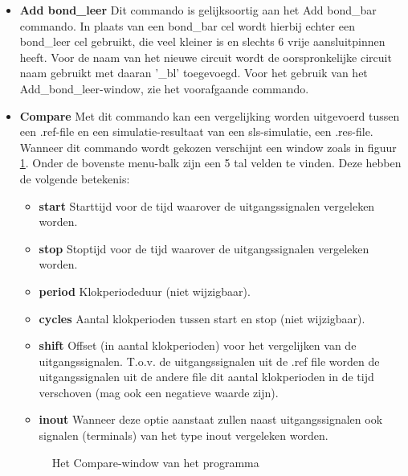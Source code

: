\begin{itemize}
\item{\bf Add bond\_leer}
Dit commando is gelijksoortig aan het Add bond\_bar commando.
In plaats van een bond\_bar cel wordt hierbij echter een bond\_leer cel gebruikt,
die veel kleiner is en slechts 6 vrije aansluitpinnen heeft.
Voor de naam van het nieuwe circuit wordt de oorspronke\-lij\-ke circuit naam
gebruikt met daaran '\_bl' toegevoegd.
Voor het gebruik van het Add\_bond\_leer-window, zie het voorafgaande commando.

\item{\bf Compare}
Met dit commando kan een vergelijking worden uitgevoerd tussen een .ref-file en
een simulatie-resultaat van een sls-simulatie, een .res-file.
Wanneer dit commando wordt gekozen verschijnt een window zoals in
figuur \ref{compare-window}.
Onder de bovenste menu-balk zijn een 5 tal velden te vinden.
Deze hebben de volgende betekenis:
\begin{itemize}
\item {\bf start} Starttijd voor de tijd waarover de uitgangssignalen vergeleken worden.
\item {\bf stop} Stoptijd voor de tijd waarover de uitgangssignalen vergeleken worden.
\item {\bf period} Klokperiodeduur (niet wijzigbaar).
\item {\bf cycles} Aantal klokperioden tussen start en stop (niet wijzigbaar).
\item {\bf shift} Offset (in aantal klokperioden) voor het vergelijken van de uitgangssignalen. 
                  T.o.v. de uitgangssignalen uit de .ref file worden de uitgangssignalen
                  uit de andere file dit aantal klokperioden in de tijd verschoven (mag ook een negatieve
                  waarde zijn).
\item {\bf inout} Wanneer deze optie aanstaat zullen naast uitgangssignalen ook signalen (terminals)
                  van het type inout vergeleken worden.
\end{itemize}

\begin{figure}[htb]
\centerline{}
\caption{Het Compare-window van het programma }
\label{compare-window}
\end{figure}


\end{itemize}
